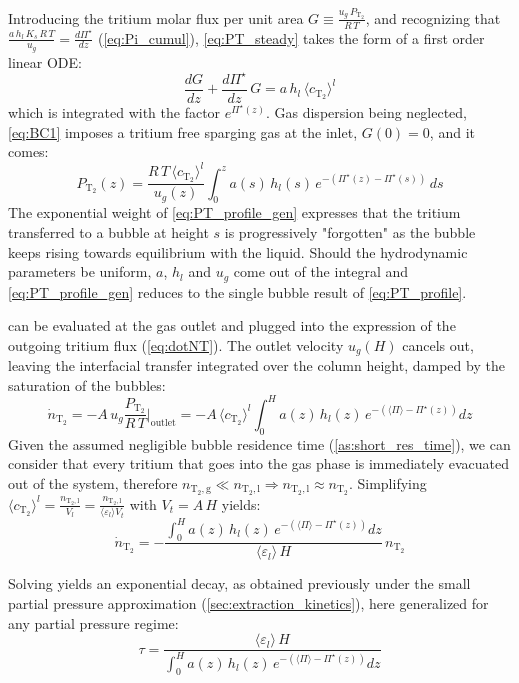 \documentclass[a4paper,11pt,oneside]{report}
\newcommand{\PT}{\ensuremath{P_\mathrm{T_2}}}
\newcommand{\CT}{\ensuremath{c_\mathrm{T_2}}}
\newcommand{\NT}{\ensuremath{n_\mathrm{T_2}}}
\newcommand{\dotNT}{\ensuremath{\dot n_\mathrm{T_2}}}
\newcommand{\NTl}{\ensuremath{n_\mathrm{T_2,l}}}
\newcommand{\NTg}{\ensuremath{n_\mathrm{T_2,g}}}
\begin{document}
Introducing the tritium molar flux per unit area $G\equiv\frac{u_g\,\PT}{R\,T}$, and recognizing that $\frac{a\,h_l\,K_s\,R\,T}{u_g}=\frac{d\Pi^\star}{dz}$ (\cref{eq:Pi_cumul}), \cref{eq:PT_steady} takes the form of a first order linear ODE:
\begin{equation}
    \frac{dG}{dz}+\frac{d\Pi^\star}{dz}\,G=a\,h_l\,\langle\CT\rangle^l
\end{equation}
which is integrated with the factor $e^{\Pi^\star(z)}$. Gas dispersion being neglected, \cref{eq:BC1} imposes a tritium free sparging gas at the inlet, $G(0)=0$, and it comes:
\begin{equation}
\label{eq:PT_profile_gen}
    \PT(z)=\frac{R\,T\,\langle\CT\rangle^l}{u_g(z)}\int_0^z a(s)\,h_l(s)\,e^{-\left(\Pi^\star(z)-\Pi^\star(s)\right)}\,ds
\end{equation}
The exponential weight of \cref{eq:PT_profile_gen} expresses that the tritium transferred to a bubble at height $s$ is progressively "forgotten" as the bubble keeps rising towards equilibrium with the liquid. Should the hydrodynamic parameters be uniform, $a$, $h_l$ and $u_g$ come out of the integral and \cref{eq:PT_profile_gen} reduces to the single bubble result of \cref{eq:PT_profile}.

 can be evaluated at the gas outlet and plugged into the expression of the outgoing tritium flux (\cref{eq:dotNT}). The outlet velocity $u_g(H)$ cancels out, leaving the interfacial transfer integrated over the column height, damped by the saturation of the bubbles:
\begin{equation}
    \dotNT=-A\,u_g\frac{\PT}{R\,T}\bigg\rvert_\mathrm{outlet}=-A\,\langle\CT\rangle^l\int_0^H a(z)\,h_l(z)\,e^{-\left(\langle\Pi\rangle-\Pi^\star(z)\right)}dz
\end{equation}
Given the assumed negligible bubble residence time (\cref{as:short_res_time}), we can consider that every tritium that goes into the gas phase is immediately evacuated out of the system, therefore $\NTg\ll\NTl \Rightarrow \NTl\approx\NT$. Simplifying $\langle \CT\rangle^l=\frac{\NTl}{V_l}=\frac{\NTl}{\langle \varepsilon_l\rangle V_t}$ with $V_t=A\,H$ yields:
\begin{equation}
    \dotNT=-\frac{\int_0^H a(z)\,h_l(z)\,e^{-\left(\langle\Pi\rangle-\Pi^\star(z)\right)}dz}{\langle \varepsilon_l \rangle\,H}\,\NT
\end{equation}

Solving yields an exponential decay, as obtained previously under the small partial pressure approximation (\cref{sec:extraction_kinetics}), here generalized for any partial pressure regime:
\begin{equation}
\label{eq:tau_full}
    \boxed{\tau =\frac{\langle \varepsilon_l \rangle\,H}{\int_0^H a(z)\,h_l(z)\,e^{-\left(\langle\Pi\rangle-\Pi^\star(z)\right)}dz}}
\end{equation}
\end{document}
